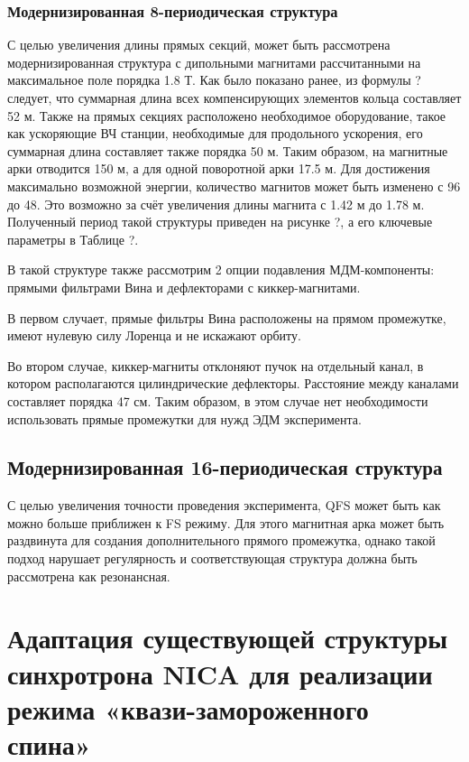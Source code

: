	\subsubsection{Модернизированная 8-периодическая структура}\label{sec:EDM/optics/8period/modern}
\par С целью увеличения длины прямых секций, может быть рассмотрена модернизированная структура с дипольными магнитами рассчитанными на максимальное поле порядка 1.8 Т. Как было показано ранее, из формулы ? следует, что суммарная длина всех компенсирующих элементов кольца составляет 52 м. Также на прямых секциях расположено необходимое оборудование, такое как ускоряющие ВЧ станции, необходимые для продольного ускорения, его суммарная длина составляет также порядка 50 м. Таким образом, на магнитные арки отводится 150 м, а для одной поворотной арки 17.5 м. Для достижения максимально возможной энергии, количество магнитов может быть изменено с 96 до 48. Это возможно за счёт увеличения длины магнита с 1.42 м до 1.78 м. Полученный период такой структуры приведен на рисунке ?, а его ключевые параметры в Таблице ?.

В такой структуре также рассмотрим 2 опции подавления МДМ-компоненты: прямыми фильтрами Вина и дефлекторами с киккер-магнитами.

В первом случает, прямые фильтры Вина расположены на прямом промежутке, имеют нулевую силу Лоренца и не искажают орбиту. 

Во втором случае, киккер-магниты отклоняют пучок на отдельный канал, в котором располагаются цилиндрические дефлекторы. Расстояние между каналами составляет порядка 47 см. Таким образом, в этом случае нет необходимости использовать прямые промежутки для нужд ЭДМ эксперимента. 

	\subsection{Модернизированная 16-периодическая структура}\label{sec:EDM/optics/16period}
\par С целью увеличения точности проведения эксперимента, QFS может быть как можно больше приближен к FS режиму. Для этого магнитная арка может быть раздвинута для создания дополнительного прямого промежутка, однако такой подход нарушает регулярность и соответствующая структура должна быть рассмотрена как резонансная.

	\section{Адаптация существующей структуры синхротрона NICA для реализации режима «квази-замороженного спина»}\label{sec:EDM/QFS}

